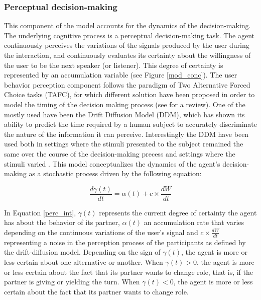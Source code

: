\subsubsection{Perceptual decision-making}

This component of the model accounts for the dynamics of the decision-making. The underlying cognitive process is a perceptual decision-making task. The agent continuously perceives the variations of the signals produced by the user during the interaction, and continuously evaluates its certainty about the willingness of the user to be the next speaker (or listener). This degree of certainty is represented by an accumulation variable (see Figure \ref{mod_conc}).
The user behavior perception component follows the paradigm of Two Alternative Forced Choice tasks (TAFC), for which different solution have been proposed in order to model the timing of the decision making process (see \citep{bogacz_physics_2006} for a review). 
One of the mostly used have been the Drift Diffusion Model (DDM), which has shown its ability to predict the time required by a human subject to accurately discriminate the nature of the information it can perceive. 
Interestingly the DDM have been used both in settings where the stimuli presented to the subject remained the same over the course of the decision-making precess and settings where the stimuli varied \cite{ratcliff_note_1980}. This model conceptualizes the dynamics of the agent's decision-making as a stochastic process driven by the following equation:

\begin{equation}
  \frac{d\gamma(t)}{dt}=\alpha(t)+c\times\frac{dW}{dt}
  \label{perc_int}
\end{equation}

In Equation \ref{perc_int}, $\gamma(t)$ represents the current degree of certainty the agent has about the behavior of its partner, $\alpha(t)$ an accumulation rate that varies depending on the continuous variations of the user's signal and $c\times\frac{dW}{dt}$ representing a noise in the perception process of the participants as defined by the drift-diffusion model. Depending on the sign of $\gamma(t)$, the agent is more or less certain about one alternative or another. When $\gamma(t)>0$, the agent is more or less certain about the fact that its partner wants to change role, that is, if the partner is giving or yielding the turn. When  $\gamma(t)<0$, the agent is more or less certain about the fact that its partner wants to change role. 

